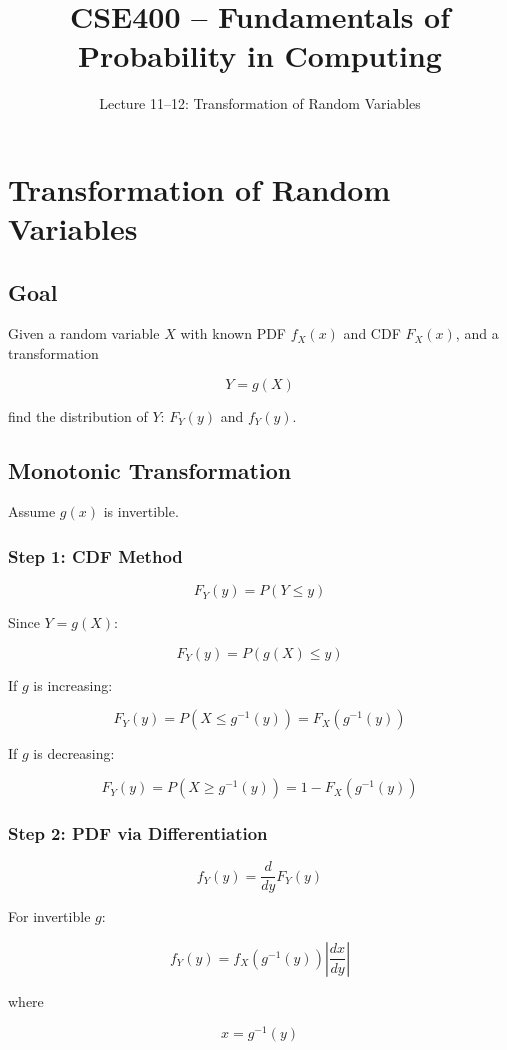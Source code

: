 \documentclass[12pt]{article}
\title{CSE400 -- Fundamentals of Probability in Computing}
\author{Lecture 11--12: Transformation of Random Variables}
\date{}
\begin{document}
\maketitle

\section{Transformation of Random Variables}

\subsection*{Goal}

Given a random variable $X$ with known PDF $f_X(x)$ and CDF $F_X(x)$, and a transformation

\[
Y = g(X)
\]

find the distribution of $Y$: $F_Y(y)$ and $f_Y(y)$.

\subsection{Monotonic Transformation}

Assume $g(x)$ is invertible.

\subsubsection*{Step 1: CDF Method}

\[
F_Y(y) = P(Y \le y)
\]

Since $Y=g(X)$:

\[
F_Y(y) = P(g(X) \le y)
\]

If $g$ is increasing:

\[
F_Y(y) = P(X \le g^{-1}(y)) = F_X(g^{-1}(y))
\]

If $g$ is decreasing:

\[
F_Y(y) = P(X \ge g^{-1}(y)) = 1 - F_X(g^{-1}(y))
\]

\subsubsection*{Step 2: PDF via Differentiation}

\[
f_Y(y) = \frac{d}{dy}F_Y(y)
\]

For invertible $g$:

\[
f_Y(y) = f_X(g^{-1}(y)) \left| \frac{dx}{dy} \right|
\]

where

\[
x = g^{-1}(y)
\]
\end{document}
